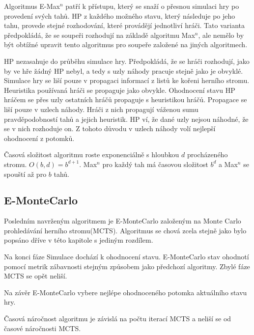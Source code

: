Algoritmus E-Max$^n$ patří k přístupu, který se snaží o přesnou simulaci hry po provedení svých tahů. HP z každého možného stavu, který následuje po jeho tahu, provede stejné rozhodování, které provádějí jednotliví hráči. Tato varianta předpokládá, že se soupeři rozhodují na základě algoritmu Max$^n$, ale nemělo by být obtížné upravit tento algoritmus pro soupeře založené na jiných algoritmech.

HP nezasahuje do průběhu simulace hry. Předpokládá, že se hráči rozhodují, jako by ve hře žádný HP nebyl, a tedy s uzly náhody pracuje stejně jako je obvyklé. Simulace hry se liší pouze v propagaci informací z listů ke kořeni herního stromu. Heuristika používaná hráči se propaguje jako obvykle. Ohodnocení stavu HP hráčem se přes uzly ostatních hráčů propaguje s heuristikou hráčů. Propagace se liší pouze v uzlech náhody. Hráči z nich propagují váženou sumu pravděpodobností tahů a jejich heuristik. HP ví, že dané uzly nejsou náhodné, že se v nich rozhoduje on. Z tohoto důvodu v uzlech náhody volí nejlepší ohodnocení z potomků.

Časová složitost algoritmu roste exponenciálně s hloubkou $d$ procházeného stromu. $O(b, d) = b^{d+1}$. Max$^n$ pro každý tah má časovou složitost $b^d$ a Max$^n$ se spouští až pro $b$ tahů.

\subsection{E-MonteCarlo}

Posledním navrženým algoritmem je E-MonteCarlo založeným na Monte Carlo prohledávání herního stromu(MCTS). Algoritmus se chová zcela stejně jako bylo popsáno dříve v této kapitole s jediným rozdílem.

Na konci fáze Simulace dochází k ohodnocení stavu. E-MonteCarlo stav ohodnotí pomocí metrik zábavnosti stejným způsobem jako předchozí algoritmy. Zbylé fáze MCTS se opět neliší.

Na závěr E-MonteCarlo vybere nejlépe ohodnoceného potomka aktuálního stavu hry.

Časová náročnost algoritmu je závislá na počtu iterací MCTS a neliší se od časové náročnosti MCTS.

\endinput
